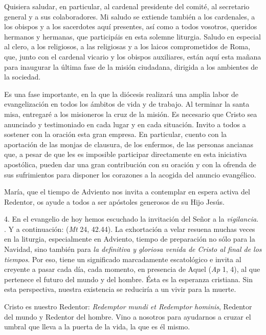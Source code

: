 \begin{body}
	Quisiera saludar, en particular, al cardenal presidente del comité, al secretario general y a sus colaboradores. Mi saludo se extiende también a los cardenales, a los obispos y a los sacerdotes aquí presentes, así como a todos vosotros, queridos hermanos y hermanas, que participáis en esta solemne liturgia. Saludo en especial al clero, a los religiosos, a las religiosas y a los laicos comprometidos de Roma, que, junto con el cardenal vicario y los obispos auxiliares, están aquí esta mañana para inaugurar la última fase de la misión ciudadana, dirigida a los ambientes de la sociedad. 
	
	Es una fase importante, en la que la diócesis realizará una amplia labor de evangelización en todos los ámbitos de vida y de trabajo. Al terminar la santa misa, entregaré a los misioneros la cruz de la misión. Es necesario que Cristo sea anunciado y testimoniado en cada lugar y en cada situación. Invito a todos a sostener con la oración esta gran empresa. En particular, cuento con la aportación de las monjas de clausura, de los enfermos, de las personas ancianas que, a pesar de que les es imposible participar directamente en esta iniciativa apostólica, pueden dar una gran contribución con su oración y con la ofrenda de sus sufrimientos para disponer los corazones a la acogida del anuncio evangélico. 
	
	María, que el tiempo de Adviento nos invita a contemplar en espera activa del Redentor, os ayude a todos a ser apóstoles generosos de su Hijo Jesús. 
	
	4. En el evangelio de hoy hemos escuchado la invitación del Señor a la \emph{vigilancia}. . Y a continuación:  (\emph{Mt} 24, 42.44). La exhortación a velar resuena muchas veces en la liturgia, especialmente en Adviento, tiempo de preparación no sólo para la Navidad, sino también para \emph{la definitiva y gloriosa venida de Cristo al final de los tiempos}. Por eso, tiene un significado marcadamente escatológico e invita al creyente a pasar cada día, cada momento, en presencia de Aquel  (\emph{Ap} 1, 4), al que pertenece el futuro del mundo y del hombre. Ésta es la esperanza cristiana. Sin esta perspectiva, nuestra existencia se reduciría a un vivir para la muerte. 
	
	Cristo es nuestro Redentor: \emph{Redemptor mundi et Redemptor hominis}, Redentor del mundo y Redentor del hombre. Vino a nosotros para ayudarnos a cruzar el umbral que lleva a la puerta de la vida, la  que es él mismo. 
	

\end{body}
